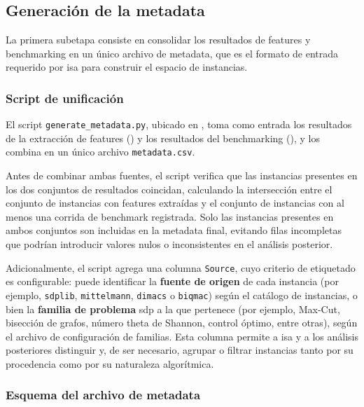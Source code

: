 \subsection{Generación de la metadata}
\label{sec:avance_metadata}

La primera subetapa consiste en consolidar los resultados de features y benchmarking
en un único archivo de metadata, que es el formato de entrada requerido por
\acrshort{isa} para construir el espacio de instancias.

\subsubsection{Script de unificación}
\label{subsec:avance_metadata_script}

El script \texttt{generate\_metadata.py}, ubicado en
, toma como entrada los resultados de la extracción
de features () y los resultados del
benchmarking (), y los combina en un único
archivo \texttt{metadata.csv}.

Antes de combinar ambas fuentes, el script verifica que las instancias presentes en
los dos conjuntos de resultados coincidan, calculando la intersección entre el
conjunto de instancias con features extraídas y el conjunto de instancias con al
menos una corrida de benchmark registrada.
Solo las instancias presentes en ambos conjuntos son incluidas en la metadata final,
evitando filas incompletas que podrían introducir valores nulos o inconsistentes en
el análisis posterior.

Adicionalmente, el script agrega una columna \texttt{Source}, cuyo criterio de
etiquetado es configurable: puede identificar la \textbf{fuente de origen} de cada
instancia (por ejemplo, \texttt{sdplib}, \texttt{mittelmann}, \texttt{dimacs} o
\texttt{biqmac}) según el catálogo de instancias, o bien la \textbf{familia de
problema} \acrshort{sdp} a la que pertenece (por ejemplo, Max-Cut, bisección de
grafos, número theta de Shannon, control óptimo, entre otras), según el archivo de
configuración de familias.
Esta columna permite a \acrshort{isa} y a los análisis posteriores distinguir y, de
ser necesario, agrupar o filtrar instancias tanto por su procedencia como por su
naturaleza algorítmica.

\clearpage
\subsubsection{Esquema del archivo de metadata}
\label{subsec:avance_metadata_esquema}

